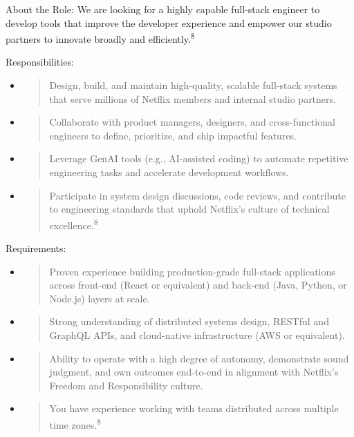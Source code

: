\documentclass[12pt,a4paper]{article}
\begin{document}
About the Role: We are looking for a highly capable full-stack engineer
to develop tools that improve the developer experience and empower our
studio partners to innovate broadly and efficiently.\textsuperscript{8}

Responsibilities:

\begin{itemize}
\item
  \begin{quote}
  Design, build, and maintain high-quality, scalable full-stack systems
  that serve millions of Netflix members and internal studio partners.
  \end{quote}
\item
  \begin{quote}
  Collaborate with product managers, designers, and cross-functional
  engineers to define, prioritize, and ship impactful features.
  \end{quote}
\item
  \begin{quote}
  Leverage GenAI tools (e.g., AI-assisted coding) to automate repetitive
  engineering tasks and accelerate development workflows.
  \end{quote}
\item
  \begin{quote}
  Participate in system design discussions, code reviews, and contribute
  to engineering standards that uphold Netflix's culture of technical
  excellence.\textsuperscript{8}
  \end{quote}
\end{itemize}

Requirements:

\begin{itemize}
\item
  \begin{quote}
  Proven experience building production-grade full-stack applications
  across front-end (React or equivalent) and back-end (Java, Python, or
  Node.js) layers at scale.
  \end{quote}
\item
  \begin{quote}
  Strong understanding of distributed systems design, RESTful and
  GraphQL APIs, and cloud-native infrastructure (AWS or equivalent).
  \end{quote}
\item
  \begin{quote}
  Ability to operate with a high degree of autonomy, demonstrate sound
  judgment, and own outcomes end-to-end in alignment with Netflix's
  Freedom and Responsibility culture.
  \end{quote}
\item
  \begin{quote}
  You have experience working with teams distributed across multiple time
  zones.\textsuperscript{8}
  \end{quote}
\end{itemize}
\end{document}
